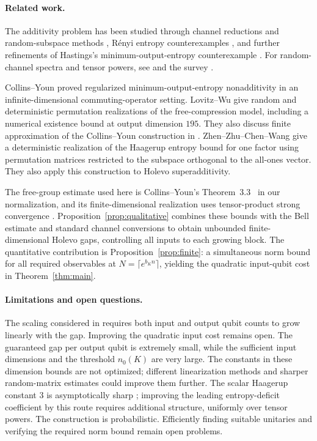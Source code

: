 \documentclass[11pt]{article}
\numberwithin{equation}{section}
\theoremstyle{boldremark}\newtheorem{remark}[theorem]{Remark}
\begin{document}
\paragraph{Related work.}
The additivity problem has been studied through channel reductions and
random-subspace methods \cite{AHW,MSW,HLW}, R\'enyi entropy counterexamples
\cite{WH,ASW10,CHLMW,GHP,SS,DL}, and further refinements of Hastings's
minimum-output-entropy counterexample \cite{BH,NS}.
For random-channel spectra and tensor powers, see
\cite{CN,CNII,BCN12,CFN,FN14,Montanaro,FN15} and the survey \cite{CNSurvey}.

Collins--Youn \cite{CY} proved regularized minimum-output-entropy
nonadditivity in an infinite-dimensional commuting-operator setting.
Lovitz--Wu \cite{LW} give random and deterministic permutation
realizations of the free-compression model, including a numerical
existence bound at output dimension $195$. They also discuss finite
approximation of the Collins--Youn construction in \cite[Section~1.3]{LW}.
Zhen--Zhu--Chen--Wang \cite{ZZCW} give a deterministic realization of
the Haagerup entropy bound for one factor using permutation matrices
restricted to the subspace orthogonal to the all-ones vector. They
also apply this construction to Holevo superadditivity.

The free-group estimate used here is Collins--Youn's
Theorem~3.3~\cite{CY} in our normalization, and its finite-dimensional
realization uses tensor-product strong convergence
\cite[Theorem~9.2]{BC}. Proposition~\ref{prop:qualitative} combines
these bounds with the Bell estimate and standard channel conversions
\cite{FW,Shor} to obtain unbounded finite-dimensional Holevo gaps,
controlling all inputs to each growing block. The quantitative
contribution is Proposition~\ref{prop:finite}: a simultaneous norm
bound for all required observables at $N=\lceil e^{b_Kn}\rceil$,
yielding the quadratic input-qubit cost in Theorem~\ref{thm:main}.

\paragraph{Limitations and open questions.}
The scaling considered in \cite[Section~2, Eq.~(11)]{HP} requires both input and
output qubit counts to grow linearly with the
gap. Improving the quadratic input cost remains open.
The guaranteed gap per output qubit is extremely small, while the
sufficient input dimensions and the threshold $n_0(K)$ are very large.
The constants in these dimension bounds are not optimized; different
linearization methods and sharper random-matrix estimates could improve
them further.
The scalar Haagerup constant $3$ is asymptotically sharp
\cite[Section~7]{ZZCW}; improving the leading entropy-deficit
coefficient by this route requires additional structure, uniformly
over tensor powers.
The construction is probabilistic. Efficiently finding suitable unitaries and
verifying the required norm bound remain open problems.
\end{document}
